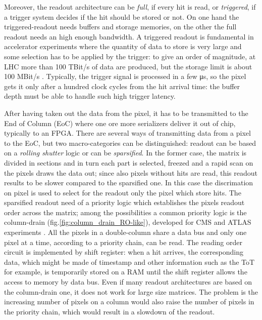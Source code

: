    Moreover, the readout architecture can be \textit{full}, if every hit is read, or \textit{triggered}, if a trigger system decides if the hit should be stored or not. On one hand the triggered-readout needs buffers and storage memories, on the other the full readout needs an high enough bandwidth.
   A triggered readout is fundamental in accelerator experiments where the quantity of data to store is very large and some selection has to be applied by the trigger: to give an order of magnitude, at LHC more than 100 TBit/s of data are produced, but the storage limit is about 100 MBit/s \cite{K-Wermes}.
   Typically, the trigger signal is processed in a few \si{\us}, so the pixel gets it only after a hundred clock cycles from the hit arrival time: the buffer depth must be able to handle such high trigger latency. 
   
   After having taken out the data from the pixel, it has to be transmitted to the End of Column (EoC) where one ore more serializers deliver it out of chip, typically to an FPGA.
   There are several ways of transmitting data from a pixel to the EoC, but two macro-categories can be distinguished: readout can be based on a \textit{rolling shutter} logic or can be \textit{sparsified}. 
   In the former case, the matrix is divided in sections and in turn each part is selected, freezed and a rapid scan on the pixels draws the data out; since also pixels without hits are read, this readout results to be slower compared to the sparsified one. In this case the discrimation on pixel is used to select for the readout only the pixel which store hits. The sparsified readout need of a priority logic which establishes the pixels readout order across the matrix; among the possibilities a common priority logic is the column-drain (fig.\ref{fig:column_drain_RO-like}), developed for CMS and ATLAS experiments \cite{column-drain}. 
   All the pixels in a double-column share a data bus and only one pixel at a time, according to a priority chain, can be read. The reading order circuit is implemented by shift register: when a hit arrives, the corresponding data, which might be made of timestamp and other information such as the ToT for example, is temporarily stored on a RAM until the shift register allows the access to memory by data bus. 
   Even if many readout architectures are based on the column-drain one, it does not work for large size matrices. The problem is the increasing number of pixels on a column would also raise the number of pixels in the priority chain, which would result in a slowdown of the readout. 

